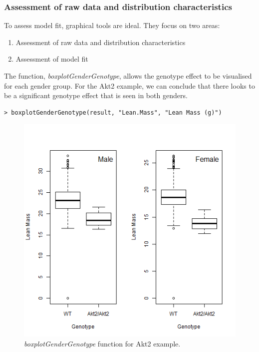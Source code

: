 \documentclass[12pt,a4paper]{article}
\begin{document}
\subsubsection{Assessment of raw data and distribution characteristics}
To assess model fit, graphical tools are ideal.  They focus on two areas:
\begin{enumerate}
 \item Assessment of raw data and distribution characteristics
 \item Assessment of model fit
\end{enumerate}
\label{AssesingModelFit}

The function, \textit{boxplotGenderGenotype}, allows the genotype effect to be visualised for each gender group. 
For the Akt2 example, we can conclude that there looks to be a significant genotype effect that is seen in both genders. 
\begingroup
    \fontsize{8pt}{12pt}\selectfont
\begin{verbatim}
> boxplotGenderGenotype(result, "Lean.Mass", "Lean Mass (g)")
\end{verbatim}
\endgroup 

\begin{figure}[H]%
\centerline{\includegraphics[scale=0.5]{cs1_boxplotGenderGenotype.png}}
\caption{\textit{boxplotGenderGenotype} function for Akt2 example.}\label{fig:14}
\end{figure}
\end{document}
